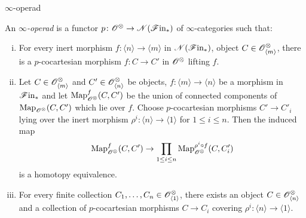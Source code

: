 


\begin{frame}{$\infty$-operad}
    \small{\begin{defin}
    An $\infty${\em-operad} is a functor $p \colon \mathscr{O}^{\otimes} \to \mathscr{N}(\mathscr{F} \text{in}_{\ast})$ of
    $\infty$-categories such that:
    \begin{enumerate}[(i)]
        \item For every inert morphism $f \colon \langle n \rangle \to \langle m
        \rangle$ in $\mathscr{N}(\mathscr{F} \text{in}_{\ast})$, object $C \in \mathscr{O}^{\otimes}_{\langle m \rangle}$,
        there is a $p$-cocartesian morphism $f \colon C \to C'$ in $\mathscr{O}^{\otimes}$
        lifting $f$. 
        \item Let $C \in \mathscr{O}^{\otimes}_{\langle m \rangle}$ and $C' \in \mathscr{O}^{\otimes}_{\langle n
        \rangle}$ be objects, $f : \langle m \rangle \to \langle n \rangle$ be a
        morphism in $\mathscr{F} \text{in}_{\ast}$ and let $\operatorname{Map}_{\mathscr{O}^{\otimes}}^f(C, C')$ be the union of
        connected components of $\operatorname{Map}_{\mathscr{O}^{\otimes}}(C, C')$ which lie over $f$. Choose
        $p$-cocartesian morphisms $C' \to C'_i$ lying over the inert morphism
        $\rho^i \colon \langle n \rangle \to \langle 1 \rangle$ for $1 \leq i
        \leq n$. Then the induced map
        \[
            \operatorname{Map}_{\mathscr{O}^{\otimes}}^f(C, C') \to \prod_{1 \leq i \leq n} \operatorname{Map}_{\mathscr{O}^{\otimes}}^{\rho^i \circ f}(C, C_i')
        \]
        is a homotopy equivalence.
        \item For every finite collection $C_1, \dots, C_n \in
        \mathscr{O}^{\otimes}_{\langle 1 \rangle}$, there exists an object $C \in \mathscr{O}^{\otimes}_{\langle n
        \rangle}$ and a collection of $p$-cocartesian morphisms $C \to C_i$
        covering $\rho^i \colon \langle n \rangle \to \langle 1 \rangle$.
    \end{enumerate}
\end{defin}}
\end{frame}

